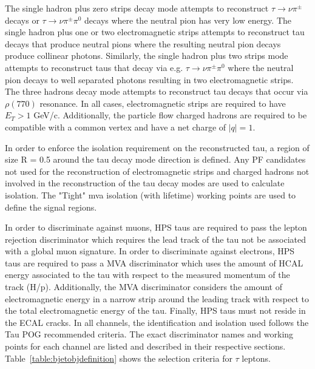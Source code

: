 The single hadron plus zero strips decay mode attempts to reconstruct $\tau \to \nu\pi^{\pm}$ decays or $\tau \to 
\nu\pi^{\pm}\pi^{0}$ decays where the neutral pion has very low energy. The single hadron plus one or two 
electromagnetic strips attempts to reconstruct tau decays that produce neutral pions where the resulting neutral pion 
decays produce collinear photons. Similarly, the single hadron plus two strips mode attempts to reconstruct taus that 
decay via e.g. $\tau \to \nu\pi^{\pm}\pi^{0}$ where the neutral pion decays to well separated photons resulting in two 
electromagnetic strips. The three hadrons decay mode attempts to reconstruct tau decays that occur via 
$\rho(770)$ resonance. In all cases, electromagnetic strips are required to have $E_{T} > 1$ GeV/c. Additionally,
the particle flow charged hadrons are required to be compatible with a common 
vertex and have a net charge of $|q|=1$.

In order to enforce the isolation requirement on the reconstructed tau, a region of size R = 0.5 around the tau decay 
mode direction is defined. Any PF candidates not used for the reconstruction of electromagnetic strips and charged 
hadrons not involved in the reconstruction of the tau decay modes are used to calculate isolation. The "Tight" mva isolation (with lifetime) working points are used to define the signal regions.

In order to discriminate against muons, HPS taus are required to pass the lepton rejection 
discriminator which requires the lead track of the tau not be associated with a global muon signature. In order to 
discriminate against electrons, HPS taus are required to pass a MVA discriminator which uses the amount of HCAL energy 
associated to the tau with respect to the measured momentum of the track (H/p). Additionally, the MVA discriminator 
considers the amount of electromagnetic energy in a narrow strip around the leading track with respect to the total 
electromagnetic energy of the tau. Finally, HPS taus must not reside in the ECAL cracks. 
In all channels, the identification and isolation used follows the Tau POG recommended criteria.
The exact discriminator names and working points for each channel are listed and described in their respective sections. Table~\ref{table:bjetobjdefinition} shows the selection criteria for $\tau$ leptons.


